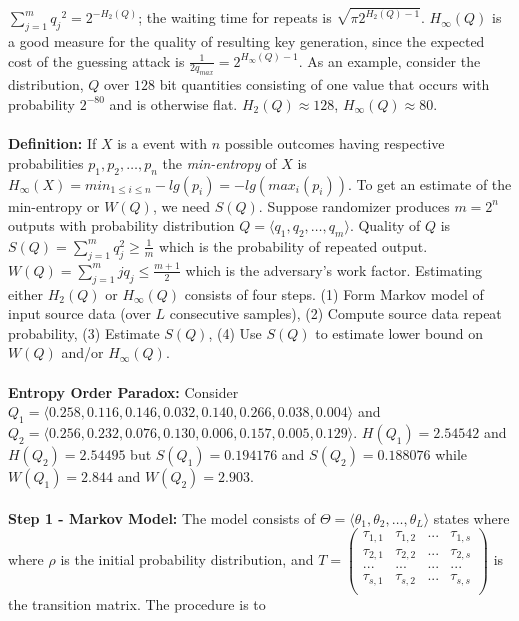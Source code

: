 $\sum_{j=1}^m {q_j}^2=2^{- H_2(Q)}$;
the waiting time for repeats is ${\sqrt {\pi 2^{H_2(Q)-1}}}$.
$H_{\infty}(Q)$ is a good measure for the quality of resulting key generation,
since the expected cost of the guessing attack is ${\frac 1 {2 q_{max}}}=2^{H_{\infty}(Q)-1}$.
As an example, consider the distribution, 
$Q$ over $128$ bit quantities consisting of one value that
occurs with probability $2^{-80}$ and is otherwise flat.  
$H_2(Q) \approx 128$, $H_{\infty}(Q) \approx 80$.
\\
\\
{\bf Definition:}
If $X$ is a event with
$n$ possible outcomes having respective probabilities $p_1 , p_2 , \ldots , p_n$
the \emph{min-entropy} of $X$ is 
$H_{\infty}(X)= min_{1 \le i \le n} -lg(p_i)= - lg(max_i(p_i))$.
To get an estimate of the min-entropy or $W(Q)$, we need $S(Q)$.
Suppose randomizer produces $m= 2^n$ outputs with probability distribution
$Q= \langle q_1, q_2 , \ldots , q_m \rangle$.  Quality of $Q$ is
$S(Q)= \sum_{j=1}^m q_j^2 \ge {\frac 1 m}$ which is the probability of repeated output.
$W(Q)= \sum_{j=1}^m j q_j \le {\frac {m+1} 2}$ which is the adversary's work factor.
Estimating either $H_2(Q)$ or $H_{\infty}(Q)$ consists of four steps.
(1) Form Markov model of input source data (over $L$ consecutive samples),
(2) Compute source data repeat probability,
(3) Estimate $S(Q)$,
(4) Use $S(Q)$ to estimate lower bound on $W(Q)$ and/or $H_{\infty}(Q)$.
\\
\\
{\bf Entropy Order Paradox:} Consider 
$Q_1=\langle 0.258, 0.116, 0.146, 0.032, 0.140, 0.266, 0.038, 0.004 \rangle$ and
$Q_2=\langle 0.256, 0.232, 0.076, 0.130, 0.006, 0.157, 0.005, 0.129 \rangle$.
$H(Q_1)= 2.54542$ and
$H(Q_2)= 2.54495$ but
$S(Q_1)= 0.194176$ and
$S(Q_2)= 0.188076$ while
$W(Q_1)= 2.844$ and
$W(Q_2)= 2.903$.
\\
\\
{\bf Step 1 -  Markov Model:}
The model consists of $\Theta= \langle  \theta_1 , \theta_2 , \ldots , \theta_L \rangle$ 
states where where $\rho$ is the initial probability distribution, and
$T=
\left(
\begin{array}{cccc}
\tau_{1,1} & \tau_{1,2} & ...  & \tau_{1,s}\\
\tau_{2,1} & \tau_{2,2} & ...  & \tau_{2,s}\\
... & ... & ... & ...\\
\tau_{s,1} & \tau_{s,2} & ...  & \tau_{s,s}\\
\end{array}
\right)$ is the transition matrix.  The procedure is to
